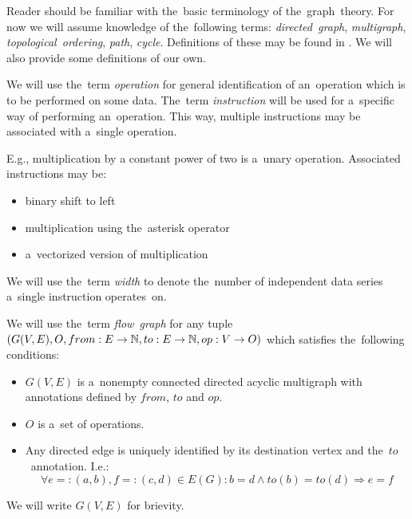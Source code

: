 Reader should be familiar with the~basic terminology of the~graph~theory. For now we will assume knowledge of the~following terms: \emph{directed~graph}, \emph{multigraph}, \emph{topological~ordering}, \emph{path}, \emph{cycle}. Definitions of these may be found in \cite{kapitoly}. We will also provide some definitions of our own.

\begin{define}
We will use the~term \emph{operation} for general identification of an~operation which is to be performed on some data. The~term \emph{instruction} will be used for a~specific way of performing an~operation. This way, multiple instructions may be associated with a~single operation.
\end{define}

E.g., multiplication by a constant power of two is a~unary operation. Associated instructions may be:
\begin{itemize}
  \item binary shift to left
  \item multiplication using the~asterisk operator
  \item a~vectorized version of multiplication
\end{itemize}

\begin{define}
We will use the~term \emph{width} to denote the~number of independent data series a~single instruction operates~on.
\end{define}

\begin{define}
We will use the~term \emph{flow~graph} for any tuple $(G(V,E),O,from:E \rightarrow \mathbb{N}, to:E \rightarrow \mathbb{N}, op:V \rightarrow O)$ which satisfies the~following conditions:
\begin{itemize}
  \item $G(V,E)$ is a~nonempty connected directed acyclic multigraph with annotations defined by $from$, $to$ and $op$.
  \item $O$ is a~set of operations.
  \item Any directed edge is uniquely identified by its destination vertex and the~$to$~annotation. I.e.:
    $$ \forall{e=:(a,b),f=:(c,d)} \in {E(G)}: b = d \wedge to(b) = to(d) \Rightarrow e = f $$
\end {itemize}
    We will write $G(V,E)$ for brievity.
\end{define}

